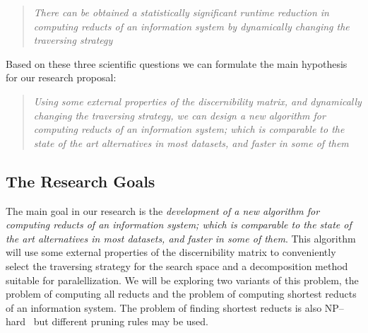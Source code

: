 \documentclass[authoryear,11pt]{elsarticle}
\begin{document}
\begin{quote}
  \emph{There can be obtained a statistically significant runtime reduction in computing reducts of an 
  		information system by dynamically changing the traversing strategy}
\end{quote}

  Based on these three scientific questions we can formulate the main hypothesis for our research proposal:
  
\begin{quote}
  \emph{Using some external properties of the discernibility matrix, and dynamically changing the traversing 
  		strategy, we can design a new algorithm for computing reducts of an information system; which is
  		comparable to the state of the art alternatives in most datasets, and faster in some of them}
\end{quote}  

\subsection{The Research Goals}\label{Goals} 
  The main goal in our research is the \emph{development of  a new algorithm for computing reducts of an 
  information system; which is comparable to the state of the art alternatives 
  in most datasets, and faster in some of them}. This algorithm will use some external properties of the
  discernibility matrix to conveniently select the traversing strategy for the search space and a 
  decomposition method suitable for paralellization. We will be exploring two variants of this problem,
  the problem of computing all reducts and the problem of computing shortest reducts of an information system.
  The problem of finding shortest reducts is also NP--hard~\citep{Lin04} but different pruning rules may
  be used.
  
\end{document}
